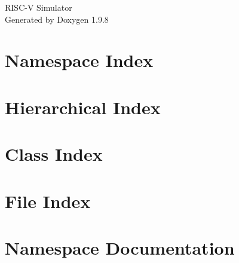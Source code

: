 \documentclass[twoside]{book}
\newcommand{\+}{\discretionary{\mbox{\scriptsize$\hookleftarrow$}}{}{}}
\newcommand{\clearemptydoublepage}{%
    \newpage{\pagestyle{empty}\cleardoublepage}%
  }
\begin{document}
  \raggedbottom
    \hypersetup{pageanchor=false,
                bookmarksnumbered=true,
                pdfencoding=unicode
               }
  \begin{titlepage}
  \vspace*{7cm}
  \begin{center}%
  {\Large RISC-\/\+V Simulator}\\
  \vspace*{1cm}
  {\large Generated by Doxygen 1.9.8}\\
  \end{center}
  \end{titlepage}
  \clearemptydoublepage
  \tableofcontents
  \clearemptydoublepage
  \hypersetup{pageanchor=true}




\chapter{Namespace Index}

\chapter{Hierarchical Index}

\chapter{Class Index}

\chapter{File Index}

\chapter{Namespace Documentation}







\end{document}
